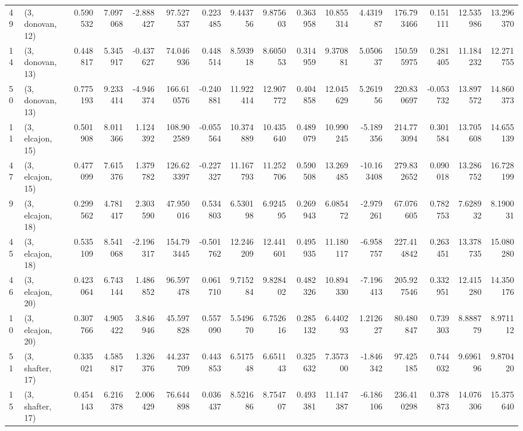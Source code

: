 \begin{tabular}{llrrrrrrrrrrrrrr}
49 &  (3, donovan, 12) &   0.590532 &   7.097068 & -2.888427 &   97.527537 &  0.223485 &   9.443756 &   9.875603 &  0.363958 &  10.855314 &   4.431987 &  176.793466 &  0.151111 &  12.535986 &  13.296370 \\
14 &  (3, donovan, 13) &   0.448817 &   5.345917 & -0.437627 &   74.046936 &  0.448514 &   8.593918 &   8.605053 &  0.314959 &   9.370881 &   5.050637 &  150.595975 &  0.281405 &  11.184232 &  12.271755 \\
50 &  (3, donovan, 13) &   0.775193 &   9.233414 & -4.946374 &  166.610576 & -0.240881 &  11.922414 &  12.907772 &  0.404858 &  12.045629 &   5.261956 &  220.830697 & -0.053732 &  13.897572 &  14.860373 \\
11 &  (3, elcajon, 15) &   0.501908 &   8.011366 &  1.124392 &  108.902589 & -0.055564 &  10.374889 &  10.435640 &  0.489079 &  10.990245 &  -5.189356 &  214.773094 &  0.301584 &  13.705608 &  14.655139 \\
47 &  (3, elcajon, 15) &   0.477099 &   7.615376 &  1.379782 &  126.623397 & -0.227327 &  11.167793 &  11.252706 &  0.590508 &  13.269485 & -10.163408 &  279.832652 &  0.090018 &  13.286752 &  16.728199 \\
9  &  (3, elcajon, 18) &   0.299562 &   4.781417 &  2.303590 &   47.950016 &  0.534803 &   6.530198 &   6.924595 &  0.269943 &   6.085472 &  -2.979261 &   67.076605 &  0.782753 &   7.628932 &   8.190031 \\
45 &  (3, elcajon, 18) &   0.535109 &   8.541068 & -2.196317 &  154.793445 & -0.501762 &  12.246209 &  12.441601 &  0.495935 &  11.180117 &  -6.958757 &  227.414842 &  0.263451 &  13.378735 &  15.080280 \\
46 &  (3, elcajon, 20) &   0.423064 &   6.743144 &  1.486852 &   96.597478 &  0.061710 &   9.715284 &   9.828402 &  0.482326 &  10.894330 &  -7.196413 &  205.927546 &  0.332951 &  12.415280 &  14.350176 \\
10 &  (3, elcajon, 20) &   0.307766 &   4.905422 &  3.846946 &   45.597828 &  0.557090 &   5.549670 &   6.752616 &  0.285132 &   6.440293 &   1.212627 &   80.480847 &  0.739303 &   8.888779 &   8.971112 \\
51 &  (3, shafter, 17) &   0.335021 &   4.585817 &  1.326376 &   44.237709 &  0.443853 &   6.517548 &   6.651143 &  0.325632 &   7.357300 &  -1.846342 &   97.425185 &  0.744032 &   9.696196 &   9.870420 \\
15 &  (3, shafter, 17) &   0.454143 &   6.216378 &  2.006429 &   76.644898 &  0.036437 &   8.521686 &   8.754707 &  0.493381 &  11.147387 &  -6.186106 &  236.410298 &  0.378873 &  14.076306 &  15.375640 \\

\end{tabular}
